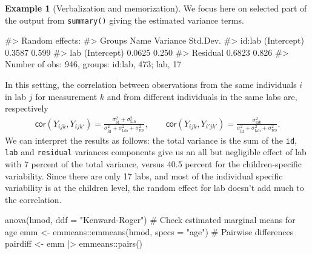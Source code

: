 \documentclass[
  11pt,
  letterpaper,
]{scrbook}
\newenvironment{Shaded}{\begin{snugshade}}{\end{snugshade}}
\newcommand{\AttributeTok}[1]{\textcolor[rgb]{0.40,0.45,0.13}{#1}}
\newcommand{\CommentTok}[1]{\textcolor[rgb]{0.37,0.37,0.37}{#1}}
\newcommand{\FunctionTok}[1]{\textcolor[rgb]{0.28,0.35,0.67}{#1}}
\newcommand{\NormalTok}[1]{\textcolor[rgb]{0.00,0.23,0.31}{#1}}
\newcommand{\OtherTok}[1]{\textcolor[rgb]{0.00,0.23,0.31}{#1}}
\newcommand{\SpecialCharTok}[1]{\textcolor[rgb]{0.37,0.37,0.37}{#1}}
\newcommand{\StringTok}[1]{\textcolor[rgb]{0.13,0.47,0.30}{#1}}
\theoremstyle{definition}
\newtheorem{example}{Example}[chapter]
\theoremstyle{definition}
\theoremstyle{remark}
\begin{document}
\begin{example}[Verbalization and
memorization]
We focus here on selected part of the output from \texttt{summary()}
giving the estimated variance terms.

\begin{Shaded}
\begin{Highlighting}[]
\CommentTok{\#\textgreater{} Random effects:}
\CommentTok{\#\textgreater{}  Groups   Name        Variance Std.Dev.}
\CommentTok{\#\textgreater{}  id:lab   (Intercept) 0.3587   0.599   }
\CommentTok{\#\textgreater{}  lab      (Intercept) 0.0625   0.250   }
\CommentTok{\#\textgreater{}  Residual             0.6823   0.826   }
\CommentTok{\#\textgreater{} Number of obs: 946, groups:  id:lab, 473; lab, 17}
\end{Highlighting}
\end{Shaded}

In this setting, the correlation between observations from the same
individuals \(i\) in lab \(j\) for measurement \(k\) and from different
individuals in the same labs are, respectively \begin{align*}
\mathsf{cor}(Y_{ijk}, Y_{ijk'}) = \frac{\sigma^2_{\text{id}} + \sigma^2_{\text{lab}}}{\sigma^2_{\text{id}} + \sigma^2_{\text{lab}} + \sigma^2_{\text{res}}}, \qquad \mathsf{cor}(Y_{ijk}, Y_{i'jk'}) = \frac{\sigma^2_{\text{lab}}}{\sigma^2_{\text{id}} + \sigma^2_{\text{lab}} + \sigma^2_{\text{res}}}.
\end{align*} We can interpret the results as follows: the total variance
is the sum of the \texttt{id}, \texttt{lab} and \texttt{residual}
variances components give us an all but negligible effect of lab with 7
percent of the total variance, versus 40.5 percent for the
children-specific variability. Since there are only 17 labs, and most of
the individual specific variability is at the children level, the random
effect for lab doesn't add much to the correlation.

\begin{Shaded}
\begin{Highlighting}[]
\FunctionTok{anova}\NormalTok{(hmod, }\AttributeTok{ddf =} \StringTok{"Kenward{-}Roger"}\NormalTok{)}
\CommentTok{\# Check estimated marginal means for age}
\NormalTok{emm }\OtherTok{\textless{}{-}}\NormalTok{ emmeans}\SpecialCharTok{::}\FunctionTok{emmeans}\NormalTok{(hmod, }\AttributeTok{specs =} \StringTok{"age"}\NormalTok{)}
\CommentTok{\# Pairwise differences}
\NormalTok{pairdiff }\OtherTok{\textless{}{-}}\NormalTok{ emm }\SpecialCharTok{|\textgreater{}}\NormalTok{ emmeans}\SpecialCharTok{::}\FunctionTok{pairs}\NormalTok{()}
\end{Highlighting}
\end{Shaded}


\end{example}
\end{document}
